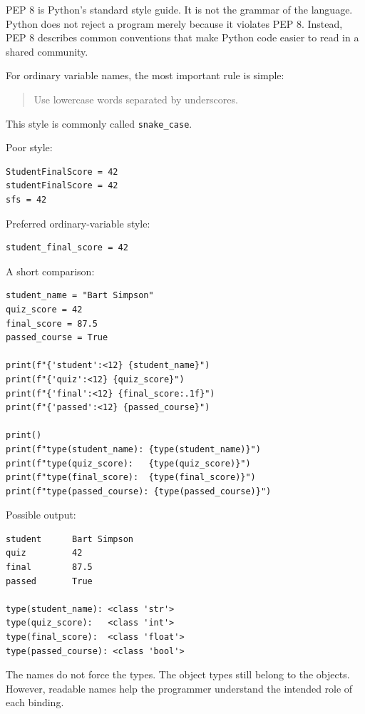 PEP 8 is Python's standard style guide. It is not the grammar of the language. Python does not reject a program merely because it violates PEP 8. Instead, PEP 8 describes common conventions that make Python code easier to read in a shared community.

For ordinary variable names, the most important rule is simple:

\begin{quote}
Use lowercase words separated by underscores.
\end{quote}

This style is commonly called \texttt{snake\_case}.

Poor style:

\begin{verbatim}
StudentFinalScore = 42
studentFinalScore = 42
sfs = 42
\end{verbatim}

Preferred ordinary-variable style:

\begin{verbatim}
student_final_score = 42
\end{verbatim}

A short comparison:

\begin{verbatim}
student_name = "Bart Simpson"
quiz_score = 42
final_score = 87.5
passed_course = True

print(f"{'student':<12} {student_name}")
print(f"{'quiz':<12} {quiz_score}")
print(f"{'final':<12} {final_score:.1f}")
print(f"{'passed':<12} {passed_course}")

print()
print(f"type(student_name): {type(student_name)}")
print(f"type(quiz_score):   {type(quiz_score)}")
print(f"type(final_score):  {type(final_score)}")
print(f"type(passed_course): {type(passed_course)}")
\end{verbatim}

Possible output:

\begin{verbatim}
student      Bart Simpson
quiz         42
final        87.5
passed       True

type(student_name): <class 'str'>
type(quiz_score):   <class 'int'>
type(final_score):  <class 'float'>
type(passed_course): <class 'bool'>
\end{verbatim}

The names do not force the types. The object types still belong to the objects. However, readable names help the programmer understand the intended role of each binding.

